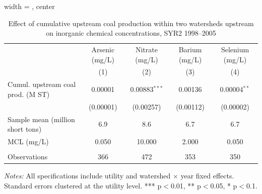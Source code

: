 \begin{table}[htbp]
   
   \caption{\label{tab:6yr_huc02fe_inorg_ravalli_2005_k2_placement} Effect of cumulative upstream coal production within two watersheds upstream on inorganic chemical concentrations, SYR2 1998--2005}
   \bigskip
   
   \centering
   
\begin{adjustbox}{width = \textwidth, center}
   \begin{tabular}{lcccc}
      \toprule
       & Arsenic (mg/L) & Nitrate (mg/L) & Barium (mg/L) & Selenium (mg/L) \\
                                        & (1)       & (2)             & (3)       & (4)\\  
      \midrule 
      Cumul. upstream coal prod. (M ST) & 0.00001   & 0.00883$^{***}$ & 0.00136   & 0.00004$^{**}$\\   
                                        & (0.00001) & (0.00257)       & (0.00112) & (0.00002)\\   
      Sample mean (million short tons)  & 6.9       & 8.6             & 6.7       & 6.7\\  
      MCL (mg/L)                        & 0.050     & 10.000          & 2.000     & 0.050\\  
       \\
      Observations                      & 366       & 472             & 353       & 350\\  
      \bottomrule
   \end{tabular}
\end{adjustbox}
   
   {\tiny\linespread{1}\selectfont \par \raggedright 
   \textit{Notes:} All specifications include utility and watershed $\times$ year fixed effects. Standard errors clustered at the utility level. *** p$<$0.01, ** p$<$0.05, * p$<$0.1.}
   
\end{table}


